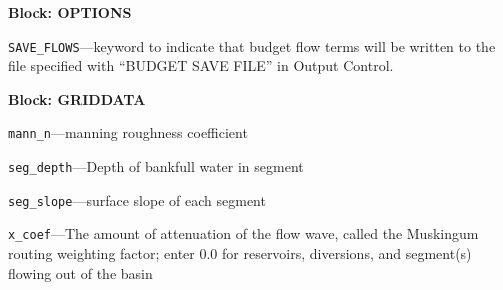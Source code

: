 
\item \textbf{Block: OPTIONS}

\begin{description}
\item \texttt{SAVE\_FLOWS}---keyword to indicate that budget flow terms will be written to the file specified with ``BUDGET SAVE FILE'' in Output Control.

\end{description}
\item \textbf{Block: GRIDDATA}

\begin{description}
\item \texttt{mann\_n}---manning roughness coefficient

\item \texttt{seg\_depth}---Depth of bankfull water in segment

\item \texttt{seg\_slope}---surface slope of each segment

\item \texttt{x\_coef}---The amount of attenuation of the flow wave, called the Muskingum routing weighting factor; enter 0.0 for reservoirs, diversions, and segment(s) flowing out of the basin

\end{description}

